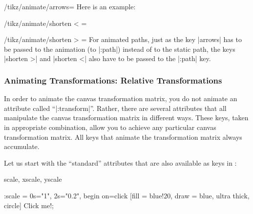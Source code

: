 \begin{key}{/tikz/animate/arrows=}
  Here is an example:

\begin{codeexample}[animation list={0.5,1,1.5,2},animation bb={(-0.1,-0.1) rectangle (1.1,1.1)}]
\end{codeexample}

\end{key}



\begin{key}{/tikz/animate/shorten < = }
\end{key}
\begin{key}{/tikz/animate/shorten > = }
  For animated paths, just as the key |arrows| has to be passed to the
  animation (to |:path|) instead of to the static path, the keys
  |shorten >| and |shorten <| also have to be passed to the |:path|
  key. 
\end{key}

\subsubsection{Animating Transformations: Relative Transformations}

In order to animate the canvas transformation matrix, you do not
animate an attribute called ``|:transform|''. Rather, there are
several attributes that all manipulate the canvas transformation
matrix in different ways. These keys, taken in appropriate
combination, allow you to achieve any particular canvas transformation
matrix. All keys that animate the transformation matrix always
accumulate.

Let us start with the ``standard'' attributes that are also available
as keys in \tikzname: 

\begin{tikzanimateattribute}{scale, xscale, yscale}
\begin{codeexample}[animation list={0.5,1,1.5,2}]
\tikz \node :scale = { 0s="1", 2s="0.2", begin on=click}
  [fill = blue!20, draw = blue, ultra thick, circle] {Click me!}; 
\end{codeexample}
\end{tikzanimateattribute}

